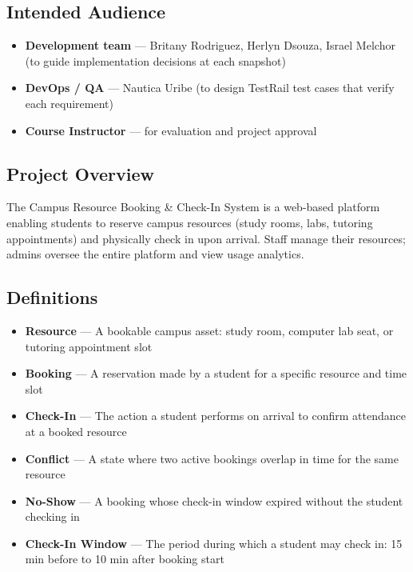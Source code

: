 \documentclass[12pt]{article}
\begin{document}
\subsection{Intended Audience}
\begin{itemize}
    \item \textbf{Development team} --- Britany Rodriguez, Herlyn Dsouza, Israel Melchor (to guide implementation decisions at each snapshot)
    \item \textbf{DevOps / QA} --- Nautica Uribe (to design TestRail test cases that verify each requirement)
    \item \textbf{Course Instructor} --- for evaluation and project approval
\end{itemize}

\subsection{Project Overview}
The Campus Resource Booking \& Check-In System is a web-based platform enabling students to reserve campus resources (study rooms, labs, tutoring appointments) and physically check in upon arrival. Staff manage their resources; admins oversee the entire platform and view usage analytics.

\subsection{Definitions}
\begin{itemize}
    \item \textbf{Resource} --- A bookable campus asset: study room, computer lab seat, or tutoring appointment slot
    \item \textbf{Booking} --- A reservation made by a student for a specific resource and time slot
    \item \textbf{Check-In} --- The action a student performs on arrival to confirm attendance at a booked resource
    \item \textbf{Conflict} --- A state where two active bookings overlap in time for the same resource
    \item \textbf{No-Show} --- A booking whose check-in window expired without the student checking in
    \item \textbf{Check-In Window} --- The period during which a student may check in: 15 min before to 10 min after booking start
\end{itemize}

\end{document}

